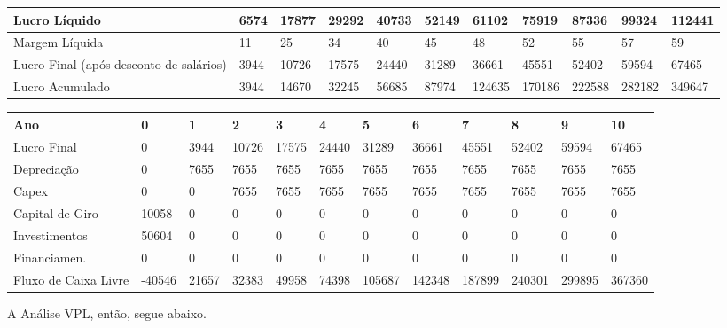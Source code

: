\documentclass[a4paper, 12pt]{paper}
\begin{document}
\begin{landscape}
\begin{table}[ht]
\begin{tabular}{p{5cm}p{1.5cm}p{1.5cm}p{1.5cm}p{1.5cm}p{1.5cm}p{1.5cm}p{1.5cm}p{1.5cm}p{1.5cm}p{1.5cm}}
	Lucro Líquido & 6574 & 17877 & 29292 & 40733 & 52149 & 61102 & 75919 & 87336 & 99324 & 112441 \\ \hline
	Margem Líquida & 11 & 25 & 34 & 40 & 45 & 48 & 52 & 55 & 57 & 59 \\ \hline
	Lucro Final (após desconto de salários) & 3944 & 10726 & 17575 & 24440 & 31289 & 36661 & 45551 & 52402 & 59594 & 67465 \\ \hline
	Lucro Acumulado & 3944 & 14670 & 32245 & 56685 & 87974 & 124635 & 170186 & 222588 & 282182 & 349647 \\ \hline
		\end{tabular}
		\begin{tabular}{p{6.2cm}p{1.2cm}p{1.2cm}p{1.2cm}p{1.2cm}p{1.2cm}p{1.2cm}p{1.2cm}p{1.2cm}p{1.2cm}p{1.2cm}p{1.2cm}}
			\cellcolor{gray}Ano & \cellcolor{gray}0 & \cellcolor{gray}1 & \cellcolor{gray}2 & \cellcolor{gray}3 & \cellcolor{gray}4 & \cellcolor{gray}5 & \cellcolor{gray}6 & \cellcolor{gray}7 & \cellcolor{gray}8 &\cellcolor{gray} 9 & \cellcolor{gray}10 \\ \hline
			Lucro Final & 0 & 3944 & 10726 & 17575 & 24440 & 31289 & 36661 & 45551 & 52402 & 59594 & 67465 \\ \hline
			Depreciação & 0 & 7655 & 7655 & 7655 & 7655 & 7655 & 7655 & 7655 & 7655 & 7655 & 7655 \\ \hline
			Capex & 0 & 0 & 7655 & 7655 & 7655 & 7655 & 7655 & 7655 & 7655 & 7655 & 7655 \\ \hline
			Capital de Giro & 10058 & 0 & 0 & 0 & 0 & 0 & 0 & 0 & 0 & 0 & 0 \\ \hline
			Investimentos & 50604 & 0 & 0 & 0 & 0 & 0 & 0 & 0 & 0 & 0 & 0 \\ \hline
			Financiamen. & 0 & 0 & 0 & 0 & 0 & 0 & 0 & 0 & 0 & 0 & 0 \\ \hline
			Fluxo de Caixa Livre & -40546 & 21657 & 32383 & 49958 & 74398 & 105687 & 142348 & 187899 & 240301 & 299895 & 367360 \\ \hline
		\end{tabular}		
	\end{table}
	
	
	\end{landscape}
	
A Análise VPL, então, segue abaixo.	
\end{document}

